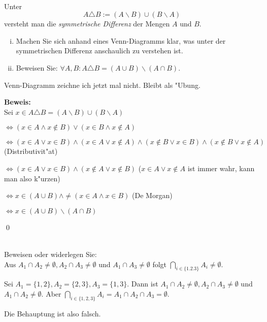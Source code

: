 \\
  Unter 
  \[A\triangle B:=(A\backslash B)\cup (B\backslash A)\] versteht man die \textit{symmetrische Differenz} der Mengen $A$ und $B$.
  \begin{enumerate}[(i)]
    \item Machen Sie sich anhand eines Venn-Diagramms klar, was unter der symmetrischen Differenz anschaulich zu verstehen ist.
    \item Beweisen Sie: $\forall A,B:A\triangle B=(A\cup B)\backslash(A\cap B)$.
  \end{enumerate}

\begin{loesung}
Venn-Diagramm zeichne ich jetzt mal nicht. Bleibt als "Ubung.

\textbf{Beweis:}\\
Sei $x\in A\triangle B=(A\backslash B)\cup (B\backslash A)$

$\Leftrightarrow (x\in A\wedge x\notin B)\vee (x\in B\wedge x\notin A)$

$\Leftrightarrow (x\in A\vee x\in B)\wedge (x\in A\vee x\notin A)\wedge (x\notin B\vee x\in B)\wedge (x\notin B\vee x\notin A)$ (Distributivit"at)

$\Leftrightarrow (x\in A\vee x\in B)\wedge (x\notin A\vee x\notin B)$ ($x\in A\vee x\notin A$ ist immer wahr, kann man also k"urzen)

$\Leftrightarrow x\in (A\cup B)\wedge \neq (x\in A\wedge x\in B)$ (De Morgan)

$\Leftrightarrow x\in(A\cup B)\backslash(A\cap B)$

\qed
\end{loesung}

 \\
Beweisen oder widerlegen Sie:\\
Aus $A_1\cap A_2\neq\emptyset, A_2\cap A_3\neq\emptyset$ und $A_1\cap A_3\neq\emptyset$ folgt $\bigcap_{i\in\{1.2.3\}}A_i\neq\emptyset$.

\begin{loesung}
  Sei $A_1=\{1,2\}, A_2=\{2,3\},A_3=\{1,3\}$. Dann ist $A_1\cap A_2\neq\emptyset, A_2\cap A_3\neq\emptyset$ und $A_1\cap A_2\neq \emptyset$. 
  Aber $\bigcap_{i\in\{1,2,3\}}A_i=A_1\cap A_2\cap A_3=\emptyset$. 
  
  Die Behauptung ist also falsch.
\end{loesung}

